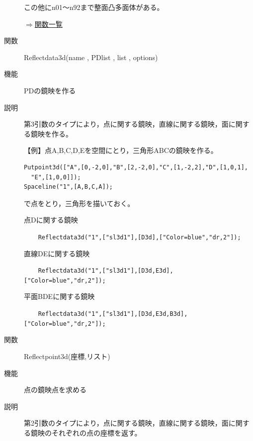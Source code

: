 \documentclass[papersize,a4paper,12pt,uplatex]{jsarticle}
\begin{document}
\begin{description}
\vspace{\baselineskip}
  

この他にn01〜n92まで整面凸多面体がある。


\begin{flushright} \hyperlink{functionlist}{$\Rightarrow$関数一覧}\end{flushright}

\hypertarget{reflectdata3d}{}
\item[関数]  Reflectdata3d(name , PDlist , list , options)
\item[機能]  PDの鏡映を作る
\item[説明]  第3引数のタイプにより，点に関する鏡映，直線に関する鏡映，面に関する鏡映を作る。

\vspace{\baselineskip}
【例】点A,B,C,D,Eを空間にとり，三角形ABCの鏡映を作る。

\begin{verbatim}
Putpoint3d(["A",[0,-2,0],"B",[2,-2,0],"C",[1,-2,2],"D",[1,0,1],
  "E",[1,0,0]]);
Spaceline("1",[A,B,C,A]);
\end{verbatim}

で点をとり，三角形を描いておく。

点Dに関する鏡映

 \verb|    Reflectdata3d("1",["sl3d1"],[D3d],["Color=blue","dr,2"]);|

\hspace{20mm} 

直線DEに関する鏡映 

 \verb|    Reflectdata3d("1",["sl3d1"],[D3d,E3d],["Color=blue","dr,2"]);|

\hspace{20mm} 

平面BDEに関する鏡映

\verb|    Reflectdata3d("1",["sl3d1"],[D3d,E3d,B3d],["Color=blue","dr,2"]);|

\hspace{20mm} 
 

\vspace{\baselineskip}
\hypertarget{reflectpoint3d}{}
\item[関数]  Reflectpoint3d(座標,リスト)
\item[機能]  点の鏡映点を求める
\item[説明]  第2引数のタイプにより，点に関する鏡映，直線に関する鏡映，面に関する鏡映のそれぞれの点の座標を返す。


\end{description}
\end{document}

